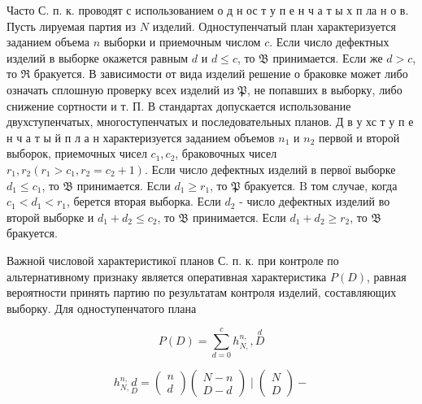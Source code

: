 \documentclass[10pt]{article}
\begin{document}
Часто С. п. к. проводят с использованием о д н ос т у п е н ч а т ы х п ла н о в. Пусть лируемая партия из $N$ изделий. Одноступенчатый план характеризуется заданием объема $n$ выборки и приемочным числом $c$. Если число дефектных изделий в выборке окажется равным $d$ и $d \leqslant c$, то $\mathfrak{B}$ принимается. Если же $d>c$, то $\Re$ бракуется. В зависимости от вида изделий решение о браковке может либо означать сплошную проверку всех изделий из $\mathfrak{P}$, не попавших в выборку, либо снижение сортности и т. П. В стандартах допускается использование двухступенчатых, многоступенчатых и последовательных планов. Д в у хс т у п е н ч а т ы й п л а н характеризуется заданием объемов $n_{1}$ и $n_{2}$ первой и второй выборок, приемочных чисел $c_{1}, c_{2}$, браковочных чисел $r_{1}, r_{2}\left(r_{1}>c_{1}, r_{2}=c_{2}+1\right)$. Если число дефектных изделий в первої выборке $d_{1} \leqslant c_{1}$, то $\mathfrak{B}$ принимается. Если $d_{1} \geqslant r_{1}$, то $\mathfrak{P}$ бракуется. $\mathrm{B}$ том случае, когда $c_{1}<d_{1}<r_{1}$, берется вторая выборка. Если $d_{2}$ - число дефектных изделий во второй выборке и $d_{1}+d_{2} \leqslant c_{2}$, то $\mathfrak{B}$ принимается. Если $d_{1}+d_{2} \geqslant r_{2}$, то $\mathfrak{B}$ бракуется.



Важной числовой характеристикої планов С. п. к. при контроле по альтернативному признаку является оперативная характеристика $P(D)$, равная вероятности принять партию по результатам контроля изделий, составляющих выборку. Для одноступенчатого плана



\[

P(D)=\sum_{d=0}^{c} h_{N,}^{n,}, \stackrel{d}{D}

\]



\[

h_{N,}^{n,} \underset{D}{d}=\left(\begin{array}{l}

n \\

d

\end{array}\right)\left(\begin{array}{l}

N-n \\

D-d

\end{array}\right) \mid\left(\begin{array}{l}

N \\

D

\end{array}\right)-

\]
\end{document}
